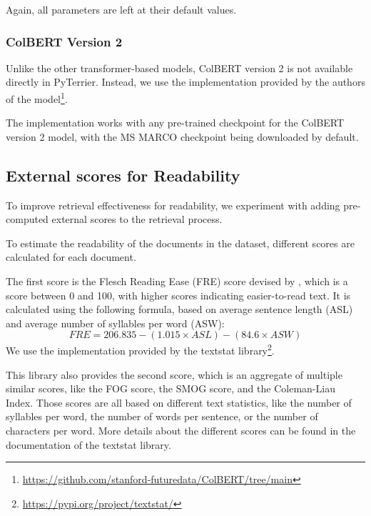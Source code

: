 Again, all parameters are left at their default values.

\subsubsection{ColBERT Version 2}
Unlike the other transformer-based models, ColBERT version 2 is not available directly in PyTerrier.
Instead, we use the implementation provided by the authors of the model\footnote{\url{https://github.com/stanford-futuredata/ColBERT/tree/main}}.

The implementation works with any pre-trained checkpoint for the ColBERT version 2 model, with the MS MARCO checkpoint being downloaded by default.

\subsection{External scores for Readability}\label{sec:external-scores}
To improve retrieval effectiveness for readability, we experiment with adding pre-computed external scores to the retrieval process.

To estimate the readability of the documents in the dataset, different scores are calculated for each document.

The first score is the Flesch Reading Ease (FRE) score devised by \cite{kincaid:1975:Derivation}, which is a score between 0 and 100, with higher scores indicating easier-to-read text.
It is calculated using the following formula, based on average sentence length (ASL) and average number of syllables per word (ASW):
\begin{equation}
    FRE = 206.835 - (1.015 \times ASL) - (84.6 \times ASW)
\end{equation}
We use the implementation provided by the textstat library\footnote{\url{https://pypi.org/project/textstat/}}.

This library also provides the second score, which is an aggregate of multiple similar scores, like the FOG score, the SMOG score, and the Coleman-Liau Index.
Those scores are all based on different text statistics, like the number of syllables per word, the number of words per sentence, or the number of characters per word.
More details about the different scores can be found in the documentation of the textstat library.

